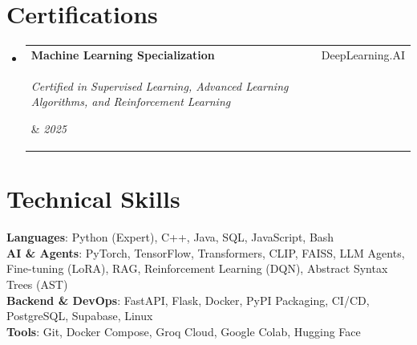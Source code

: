 \documentclass[letterpaper,11pt]{article}
\makeatletter
\newcommand{\resumeSubheading}[4]{
  \vspace{-1pt}\item
    \begin{tabular*}{0.97\textwidth}[t]{l@{\extracolsep{\fill}}r}
      \textbf{#1} & #2 \\
      \parbox[t]{0.78\textwidth}{\raggedright\textit{\small#3}} & \textit{\small #4} \\
    \end{tabular*}\vspace{-6pt}
}
\newcommand{\resumeSubHeadingListStart}{\begin{itemize}[leftmargin=0.15in, label={}]}
\newcommand{\resumeSubHeadingListEnd}{\end{itemize}}
\makeatother
\begin{document}
\section{Certifications}
  \resumeSubHeadingListStart
    \resumeSubheading
      {Machine Learning Specialization}{DeepLearning.AI}
      {Certified in Supervised Learning, Advanced Learning Algorithms, and Reinforcement Learning}{2025}
  \resumeSubHeadingListEnd


\section{Technical Skills}
 \begin{itemize}[leftmargin=0.15in, label={}]
    \small{\item{
     \textbf{Languages}{: Python (Expert), C++, Java, SQL, JavaScript, Bash} \\
     \textbf{AI \& Agents}{: PyTorch, TensorFlow, Transformers, CLIP, FAISS, LLM Agents, Fine-tuning (LoRA), RAG, Reinforcement Learning (DQN), Abstract Syntax Trees (AST)} \\
     \textbf{Backend \& DevOps}{: FastAPI, Flask, Docker, PyPI Packaging, CI/CD, PostgreSQL, Supabase, Linux} \\
     \textbf{Tools}{: Git, Docker Compose, Groq Cloud, Google Colab, Hugging Face}
    }}
 \end{itemize}


\end{document}
